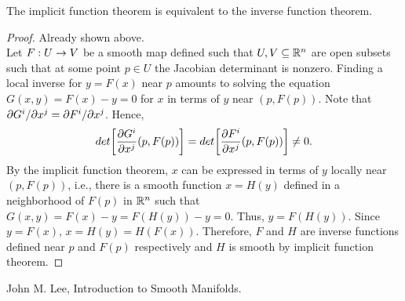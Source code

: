 \documentclass[11pt,a4paper]{article}
\begin{document}
\begin{proposition}
The implicit function theorem is equivalent to the inverse function theorem.
\end{proposition}

\begin{proof}
\forward Already shown above.
\\
\converse Let $F:U\rightarrow V$ be a smooth map defined such that $U,V\subseteq \mathbb{R}^n$ are open subsets such that at some point $p\in U$ the Jacobian determinant is nonzero. Finding a local inverse for $y = F(x)$ near $p$ amounts to solving the equation $G(x,y) = F(x)-y = 0$
for $x$ in terms of $y$ near $(p,F(p))$. Note that $\partial G^i/\partial x^{j}=\partial F^i/\partial x^{j}$. Hence,
\begin{equation*}
det\bigg[ \dfrac{\partial G^i}{\partial x^{j}}(p,F(p))\bigg] = det\bigg[ \dfrac{\partial F^i}{\partial x^{j}}(p,F(p))\bigg] \neq 0.
\end{equation*}
By the implicit function theorem, $x$ can be expressed in terms of $y$ locally near $(p,F(p))$, i.e., there is a smooth function $x = H(y)$ defined in a neighborhood of $F(p)$ in $\mathbb{R}^n$ such that $G(x,y) = F(x) - y = F(H(y)) - y = 0$. Thus, $y = F(H(y))$. Since $y = F(x)$, $x = H(y) = H(F(x))$. Therefore, $F$ and $H$ are inverse functions defined near $p$ and $F(p)$ respectively and $H$ is smooth by implicit function theorem.
\end{proof}



\begin{thebibliography}{9}
John M. Lee, Introduction to Smooth Manifolds.



\end{thebibliography}
\end{document}

